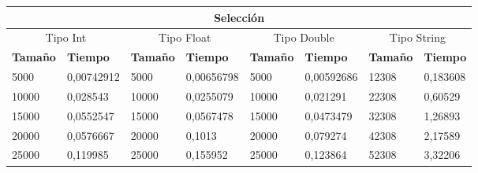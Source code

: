 \documentclass[11pt,openany]{book}
\begin{document}
\begin{table}[!ht]
    \centering
    \small
    \begin{tabular}{|l|l|l|l|l|l|l|l|}
        \hline
        \multicolumn{8}{|c|}{\cellcolor{blue!20}\textbf{Selección}}                                                                                                                                                                                                                                \\ \hline
        \multicolumn{2}{|c|}{\cellcolor{gray!20}Tipo Int} & \multicolumn{2}{c|}{\cellcolor{gray!20}Tipo Float} & \multicolumn{2}{c|}{\cellcolor{gray!20}Tipo Double} & \multicolumn{2}{c|}{\cellcolor{gray!20}Tipo String}                                                                         \\ \hline
        \textbf{Tamaño}                                   & \textbf{Tiempo}                                    & \textbf{Tamaño}                                     & \textbf{Tiempo}                                     & \textbf{Tamaño} & \textbf{Tiempo} & \textbf{Tamaño} & \textbf{Tiempo} \\ \hline
        5000                                              & 0,00742912                                         & 5000                                                & 0,00656798                                          & 5000            & 0,00592686      & 12308           & 0,183608        \\ \hline
        10000                                             & 0,028543                                           & 10000                                               & 0,0255079                                           & 10000           & 0,021291        & 22308           & 0,60529         \\ \hline
        15000                                             & 0,0552547                                          & 15000                                               & 0,0567478                                           & 15000           & 0,0473479       & 32308           & 1,26893         \\ \hline
        20000                                             & 0,0576667                                          & 20000                                               & 0,1013                                              & 20000           & 0,079274        & 42308           & 2,17589         \\ \hline
        25000                                             & 0,119985                                           & 25000                                               & 0,155952                                            & 25000           & 0,123864        & 52308           & 3,32206         \\ \hline

\end{tabular}
\end{table}
\end{document}
